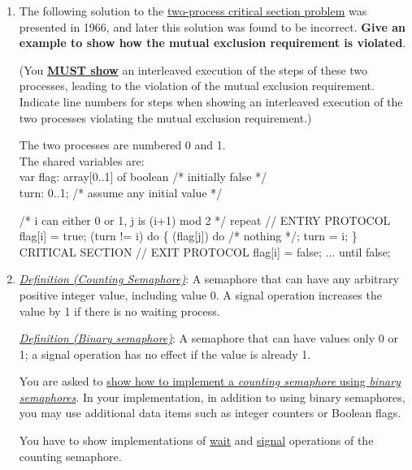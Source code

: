 \documentclass[11pt]{article}
\newcommand{\n}{\vspace{0.5cm}}
\begin{document}
\begin{enumerate}
  \item The following solution to the \ul{two-process critical section problem} was presented in 1966, and later this solution was found to be incorrect.  \textbf{Give an example to show how the mutual exclusion requirement is violated}.

    (You \textbf{\ul{MUST show}} an interleaved execution of the steps of these two processes, leading to the violation of the mutual exclusion requirement.  Indicate line numbers for steps when showing an interleaved execution of the two processes violating the mutual exclusion requirement.) \n

    The two processes are numbered 0 and 1. \\
    The shared variables are: \\
    \hspace*{1cm} var flag: array[0..1] of boolean /* initially false */ \\
    \hspace*{1cm} turn: 0..1; /* assume any initial value */

    \begin{codebox}
     \zi /* i can either 0 or 1, j is (i+1) mod 2 */
     \li repeat \Do
        \zi // ENTRY PROTOCOL
        \li flag[i] = true;
        \li \While (turn != i) do \{\Do
          \li \While (flag[j]) do /* nothing */;
          \li turn = i;
        \End
        \li \}
        \li CRITICAL SECTION
        \zi // EXIT PROTOCOL
        \li flag[i] = false;
        \li \(\hdots\)
     \End
     \li until false;
    \end{codebox}
    \newpage

  \item \textit{\ul{Definition (Counting Semaphore)}}: A semaphore that can have any arbitrary positive integer value, including value 0.  A signal operation increases the value by 1 if there is no waiting process.

    \textit{\ul{Definition (Binary semaphore)}}: A semaphore that can have values only 0 or 1; a signal operation has no effect if the value is already 1. \n

    You are asked to \ul{show how to implement a \textit{counting semaphore} using \textit{binary semaphores}}.  In your implementation, in addition to using binary semaphores, you may use additional data items such as integer counters or Boolean flags.

    You have to show implementations of \ul{wait} and \ul{signal} operations of the counting semaphore.


\end{enumerate}
\end{document}
